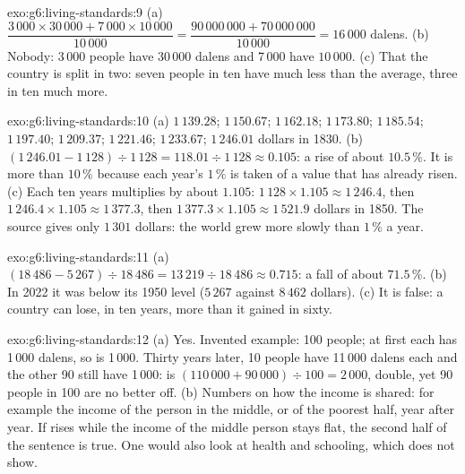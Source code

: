 \begin{solution}{exo:g6:living-standards:9}
(a) $\dfrac{3\,000 \times 30\,000 + 7\,000 \times 10\,000}{10\,000}
= \dfrac{90\,000\,000 + 70\,000\,000}{10\,000} = 16\,000$ dalens.
(b) Nobody: 3\,000 people have $30\,000$ dalens and 7\,000 have $10\,000$.
(c) That the country is split in two: seven people in ten have much less than
the average, three in ten much more.
\end{solution}

\begin{solution}{exo:g6:living-standards:10}
(a) $1\,139.28$; $1\,150.67$; $1\,162.18$; $1\,173.80$; $1\,185.54$; $1\,197.40$;
$1\,209.37$; $1\,221.46$; $1\,233.67$; $1\,246.01$ dollars in 1830.
(b) $(1\,246.01 - 1\,128) \div 1\,128 = 118.01 \div 1\,128 \approx 0.105$: a rise
of about $10.5\,\%$. It is more than $10\,\%$ because each year's $1\,\%$ is taken
of a value that has already risen. (c) Each ten years multiplies by about
$1.105$: $1\,128 \times 1.105 \approx 1\,246.4$, then $1\,246.4 \times 1.105
\approx 1\,377.3$, then $1\,377.3 \times 1.105 \approx 1\,521.9$ dollars in 1850.
The source gives only $1\,301$ dollars: the world grew more slowly than $1\,\%$
a year.
\end{solution}

\begin{solution}{exo:g6:living-standards:11}
(a) $(18\,486 - 5\,267) \div 18\,486 = 13\,219 \div 18\,486 \approx 0.715$: a fall of
about $71.5\,\%$. (b) In 2022 it was below its 1950 level ($5\,267$ against
$8\,462$ dollars). (c) It is false: a country can lose, in ten years, more than
it gained in sixty.
\end{solution}

\begin{solution}{exo:g6:living-standards:12}
(a) Yes. Invented example: 100 people; at first each has 1\,000 dalens, so
 is 1\,000. Thirty years later, 10 people have 11\,000 dalens
each and the other 90 still have 1\,000:  is
$(110\,000 + 90\,000) \div 100 = 2\,000$, double, yet 90 people in 100 are no
better off. (b) Numbers on how the income is shared: for example the income of
the person in the middle, or of the poorest half, year after year. If  rises while the income of the middle person stays flat, the second half of
the sentence is true. One would also look at health and schooling, which  does not show.
\end{solution}

